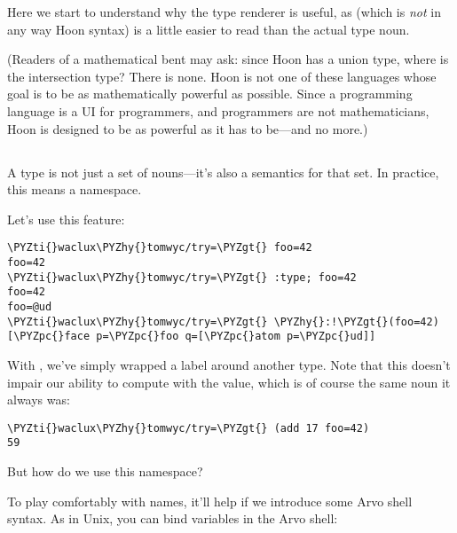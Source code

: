 Here we start to understand why the type renderer is useful, as
 (which is \emph{not} in any way Hoon syntax) is a
little easier to read than the actual type noun.

(Readers of a mathematical bent may ask: since Hoon has a union
type, where is the intersection type?  There is none.  Hoon is
not one of these languages whose goal is to be as mathematically
powerful as possible.  Since a programming language is a UI for
programmers, and programmers are not mathematicians, Hoon is
designed to be as powerful as it has to be---and no more.)

\subsection{}

A type is not just a set of nouns---it's also a semantics for
that set.  In practice, this means a namespace.

Let's use this feature:

\begin{framed_shaded}
\begin{Verbatim}[fontsize=\relsize{-2.5},fontseries=b,commandchars=\\\{\}]
\PYZti{}waclux\PYZhy{}tomwyc/try=\PYZgt{} foo=42
foo=42
\PYZti{}waclux\PYZhy{}tomwyc/try=\PYZgt{} :type; foo=42
foo=42
foo=@ud
\PYZti{}waclux\PYZhy{}tomwyc/try=\PYZgt{} \PYZhy{}:!\PYZgt{}(foo=42)
[\PYZpc{}face p=\PYZpc{}foo q=[\PYZpc{}atom p=\PYZpc{}ud]]
\end{Verbatim}
\end{framed_shaded}

With , we've simply wrapped a label around another type.
Note that this doesn't impair our ability to compute with the
value, which is of course the same noun it always was:

\begin{framed_shaded}
\begin{Verbatim}[fontsize=\relsize{-2.5},fontseries=b,commandchars=\\\{\}]
\PYZti{}waclux\PYZhy{}tomwyc/try=\PYZgt{} (add 17 foo=42)
59
\end{Verbatim}
\end{framed_shaded}

But how do we use this namespace?

To play comfortably with names, it'll help if we introduce some
Arvo shell syntax.  As in Unix, you can bind variables in the
Arvo shell:

